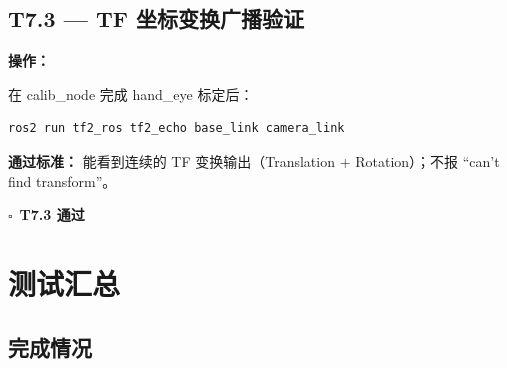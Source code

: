 \documentclass[12pt,a4paper,fontset=ubuntu]{ctexart}
\newcommand{\chkbox}{$\square$}
\newcommand{\passcriteria}[1]{%
  \textbf{通过标准：} #1%
}
\begin{document}
\subsection{T7.3 — TF 坐标变换广播验证}

\textbf{操作：}

在 calib\_node 完成 hand\_eye 标定后：

\begin{lstlisting}[language=bash]
ros2 run tf2_ros tf2_echo base_link camera_link
\end{lstlisting}

\passcriteria{
  能看到连续的 TF 变换输出（Translation + Rotation）；不报 ``can't find transform''。
}

\begin{center}\chkbox\ \textbf{T7.3 通过}\end{center}

\section{测试汇总}

\subsection{完成情况}
\end{document}
